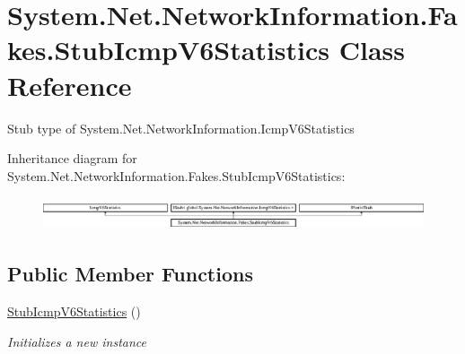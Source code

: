 \hypertarget{class_system_1_1_net_1_1_network_information_1_1_fakes_1_1_stub_icmp_v6_statistics}{\section{System.\-Net.\-Network\-Information.\-Fakes.\-Stub\-Icmp\-V6\-Statistics Class Reference}
\label{class_system_1_1_net_1_1_network_information_1_1_fakes_1_1_stub_icmp_v6_statistics}
}


Stub type of System.\-Net.\-Network\-Information.\-Icmp\-V6\-Statistics 


Inheritance diagram for System.\-Net.\-Network\-Information.\-Fakes.\-Stub\-Icmp\-V6\-Statistics\-:\begin{figure}[H]
\begin{center}
\leavevmode
\includegraphics[height=0.982456cm]{class_system_1_1_net_1_1_network_information_1_1_fakes_1_1_stub_icmp_v6_statistics}
\end{center}
\end{figure}
\subsection*{Public Member Functions}
\begin{DoxyCompactItemize}
\item 
\hyperlink{class_system_1_1_net_1_1_network_information_1_1_fakes_1_1_stub_icmp_v6_statistics_a421d39fb5140ccd2b308747730fa53a2}{Stub\-Icmp\-V6\-Statistics} ()
\begin{DoxyCompactList}\small\item\em Initializes a new instance\end{DoxyCompactList}\end{DoxyCompactItemize}
